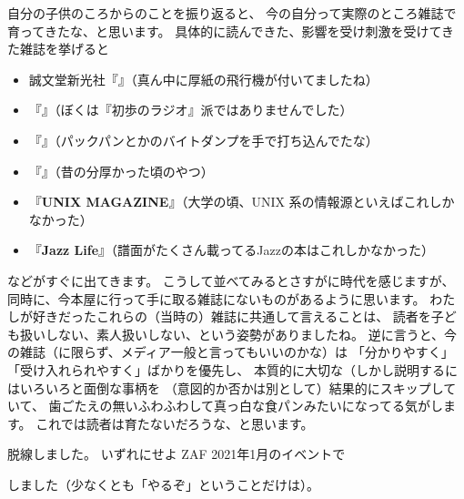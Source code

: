 \documentclass[dvipdfmx,autodetect-engine,10pt,b5paper,papersize,openany,dvipsnames]{jsbook}
\begin{document}
\begin{multicols}{2}
自分の子供のころからのことを振り返ると、
今の自分って実際のところ雑誌で育ってきたな、と思います。
具体的に読んできた、影響を受け刺激を受けてきた雑誌を挙げると
\begin{itemize}
\item 誠文堂新光社『』（真ん中に厚紙の飛行機が付いてましたね）
\item 『』（ぼくは『初歩のラジオ』派ではありませんでした）
\item 『』（パックパンとかのバイトダンプを手で打ち込んでたな）
\item 『』（昔の分厚かった頃のやつ）
\item 『{\bfseries UNIX MAGAZINE}』（大学の頃、UNIX 系の情報源といえばこれしかなかった）
\item 『{\bfseries Jazz Life}』（譜面がたくさん載ってるJazzの本はこれしかなかった）
\end{itemize}
などがすぐに出てきます。
こうして並べてみるとさすがに時代を感じますが、
同時に、今本屋に行って手に取る雑誌にないものがあるように思います。
わたしが好きだったこれらの（当時の）雑誌に共通して言えることは、
読者を子ども扱いしない、素人扱いしない、という姿勢がありましたね。
逆に言うと、今の雑誌（に限らず、メディア一般と言ってもいいのかな）は
「分かりやすく」「受け入れられやすく」ばかりを優先し、
本質的に大切な（しかし説明するにはいろいろと面倒な事柄を
（意図的か否かは別として）結果的にスキップしていて、
歯ごたえの無いふわふわして真っ白な食パンみたいになってる気がします。
これでは読者は育たないだろうな、と思います。

脱線しました。
いずれにせよ ZAF 2021年1月のイベントで
\begin{center}
  \Large {}
\end{center}
しました（少なくとも「やるぞ」ということだけは）。


\end{multicols}

\end{document}
